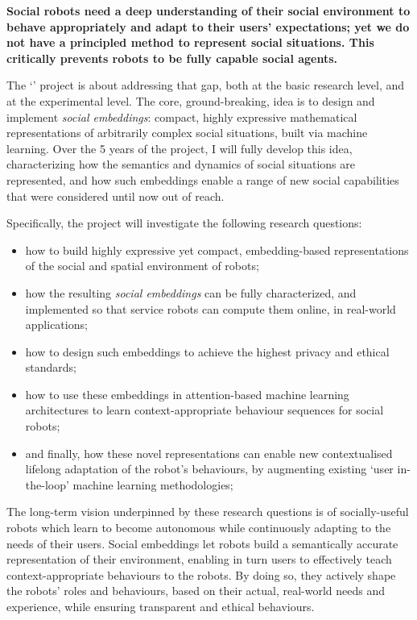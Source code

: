 \begin{framed}
\bf

\noindent\bf Social robots need a deep understanding of their social environment to
behave appropriately and adapt to their users' expectations; yet we do not have
a principled method to represent social situations. This critically prevents
robots to be fully capable social agents.

The `\project' project is about addressing that gap, both at the basic research
level, and at the experimental level. The core, ground-breaking, idea is to
design and implement \emph{social embeddings}: compact, highly expressive
mathematical representations of arbitrarily complex social situations, built via
machine learning. Over the 5 years of the project, I will fully develop this
idea, characterizing how the semantics and dynamics of social situations are
represented, and how such embeddings enable a range of new social
capabilities that were considered until now out of reach.

\noindent Specifically, the \project project will investigate the following
research questions:

\begin{itemize}
        \item how to build highly expressive yet compact, embedding-based
            representations of the social and spatial environment of robots;

        \item how the resulting \emph{social embeddings} can be fully
            characterized, and implemented so
            that service robots can compute them online, in real-world
            applications;

        \item how to design such embeddings to achieve the highest privacy and ethical
            standards;

        \item how to use these embeddings in attention-based machine
            learning architectures to learn context-appropriate behaviour
            sequences for social robots;

        \item and finally, how these novel representations can enable new contextualised lifelong
            adaptation of the robot's behaviours, by augmenting existing `user
            in-the-loop' machine learning methodologies;
\end{itemize}

\noindent The long-term vision underpinned by these research questions is of
socially-useful robots which learn to become autonomous while continuously
adapting to the needs of their users. Social embeddings let robots build a
semantically accurate representation of their environment, enabling in turn
users to effectively teach context-appropriate behaviours to the robots. By
doing so, they actively shape the robots' roles and behaviours, based on
their actual, real-world needs and experience, while ensuring transparent
and ethical behaviours.


\end{framed}
